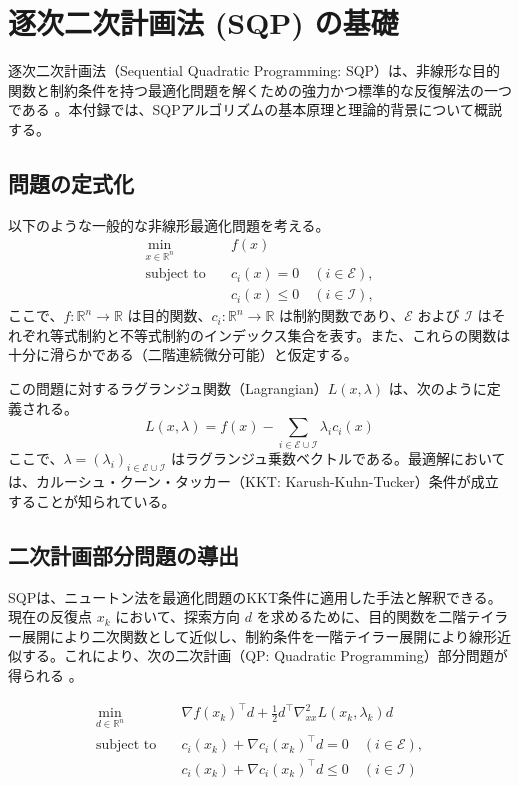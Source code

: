 \section{逐次二次計画法 (SQP) の基礎}
\label{app:sqp}

逐次二次計画法（Sequential Quadratic Programming: SQP）は、非線形な目的関数と制約条件を持つ最適化問題を解くための強力かつ標準的な反復解法の一つである \cite{nocedal2006numerical}。本付録では、SQPアルゴリズムの基本原理と理論的背景について概説する。

\subsection{問題の定式化}
以下のような一般的な非線形最適化問題を考える。
\begin{align}
    \min_{x \in \mathbb{R}^n} \quad & f(x) \label{eq:sqp_obj} \\
    \text{subject to} \quad & c_i(x) = 0 \quad (i \in \mathcal{E}), \label{eq:sqp_eq} \\
    & c_i(x) \le 0 \quad (i \in \mathcal{I}), \label{eq:sqp_ineq}
\end{align}
ここで、$f: \mathbb{R}^n \to \mathbb{R}$ は目的関数、$c_i: \mathbb{R}^n \to \mathbb{R}$ は制約関数であり、$\mathcal{E}$ および $\mathcal{I}$ はそれぞれ等式制約と不等式制約のインデックス集合を表す。また、これらの関数は十分に滑らかである（二階連続微分可能）と仮定する。

この問題に対するラグランジュ関数（Lagrangian）$L(x, \lambda)$ は、次のように定義される。
\begin{equation}
    L(x, \lambda) = f(x) - \sum_{i \in \mathcal{E} \cup \mathcal{I}} \lambda_i c_i(x)
\end{equation}
ここで、$\lambda = (\lambda_i)_{i \in \mathcal{E} \cup \mathcal{I}}$ はラグランジュ乗数ベクトルである。最適解においては、カルーシュ・クーン・タッカー（KKT: Karush-Kuhn-Tucker）条件が成立することが知られている。

\subsection{二次計画部分問題の導出}
SQPは、ニュートン法を最適化問題のKKT条件に適用した手法と解釈できる。現在の反復点 $x_k$ において、探索方向 $d$ を求めるために、目的関数を二階テイラー展開により二次関数として近似し、制約条件を一階テイラー展開により線形近似する。これにより、次の二次計画（QP: Quadratic Programming）部分問題が得られる \cite{powell1978fast}。

\begin{align}
    \min_{d \in \mathbb{R}^n} \quad & \nabla f(x_k)^\top d + \frac{1}{2} d^\top \nabla_{xx}^2 L(x_k, \lambda_k) d \label{eq:qp_obj} \\
    \text{subject to} \quad & c_i(x_k) + \nabla c_i(x_k)^\top d = 0 \quad (i \in \mathcal{E}), \label{eq:qp_eq} \\
    & c_i(x_k) + \nabla c_i(x_k)^\top d \le 0 \quad (i \in \mathcal{I}) \label{eq:qp_ineq}
\end{align}

